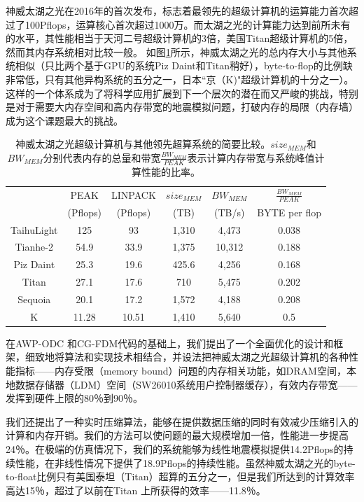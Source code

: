 \documentclass[degree=doctor]{thuthesis}
\begin{document}
神威太湖之光在2016年的首次发布\citep{fu2016sunway}，标志着最领先的超级计算机的运算能力首次超过了100Pflops，运算核心首次超过1000万。而太湖之光的计算能力达到前所未有的水平，其性能相当于天河二号超级计算机的3倍，美国Titan超级计算机的5倍，然而其内存系统相对比较一般。 如图\ref{tb:supercomputer-comp}所示，神威太湖之光的总内存大小与其他系统相似（只比两个基于GPU的系统Piz Daint和Titan稍好），byte-to-flop的比例缺非常低，只有其他异构系统的五分之一，日本“京（K)"超级计算机的十分之一）。 这样的一个体系成为了将科学应用扩展到下一个层次的潜在而又严峻的挑战，特别是对于需要大内存空间和高内存带宽的地震模拟问题，打破内存的局限（内存墙）成为这个课题最大的挑战。

\begin{table}[!t]
\footnotesize
\caption{神威太湖之光超级计算机与其他领先超算系统的简要比较。$size_{MEM}$和$BW_{MEM}$分别代表内存的总量和带宽$\frac{BW_{MEM}}{PEAK}$表示计算内存带宽与系统峰值计算性能的比率。}
\label{tb:supercomputer-comp}
\center
\begin{tabular*}{0.8\columnwidth}{cccccc}
\hline\hline
   & PEAK & LINPACK & $size_{MEM}$  & $BW_{MEM}$ & $\frac{BW_{MEM}}{PEAK}$ \\
   & (Pflops) & (Pflops) & (TB) & (TB/s) & {BYTE per flop} \\
   \hline\hline
   TaihuLight & 125 & 93 & 1,310 & 4,473 & 0.038 \\\hline
   Tianhe-2 & 54.9 & 33.9 & 1,375 & 10,312 & 0.188 \\\hline
   Piz Daint & 25.3 & 19.6 & 425.6 & 4,256 & 0.168 \\\hline
   Titan & 27.1 & 17.6 & 710 & 5,475 & 0.202 \\\hline
   Sequoia & 20.1 & 17.2 & 1,572 & 4,188 & 0.208 \\\hline
   K & 11.28 & 10.51 & 1,410 & 5,640 & 0.5 \\\hline
\hline
\end{tabular*}
\end{table}

在AWP-ODC \citep{cui2010scalable}和CG-FDM\citep{zhang2014three}代码的基础上，我们提出了一个全面优化的设计和框架，细致地将算法和实现技术相结合，并设法把神威太湖之光超级计算机的各种性能指标——内存受限（memory bound）问题的内存相关功能，如DRAM空间，本地数据存储器（LDM）空间（SW26010系统用户控制器缓存），有效内存带宽——发挥到硬件上限的80％到90％。

我们还提出了一种实时压缩算法，能够在提供数据压缩的同时有效减少压缩引入的计算和内存开销。我们的方法可以使问题的最大规模增加一倍，性能进一步提高24％。在极端的仿真情况下，我们的系统能够为线性地震模拟提供14.2Pflops的持续性能，在非线性情况下提供了18.9Pflops的持续性能。虽然神威太湖之光的byte-to-float比例只有美国泰坦（Titan）超算的五分之一，但是我们所达到的计算效率高达15％，超过了以前在Titan \citep{roten2016high}上所获得的效率——11.8％。
\end{document}

